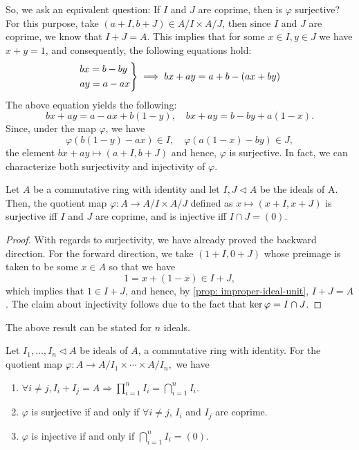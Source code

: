 So, we ask an equivalent question: If $I$ and $J$ are coprime, then is $\varphi$ surjective? For this purpose, take $(a+I, b+J) \in A / I \times A / J$, then since $I$ and $J$ are coprime, we know that $I+J=A$. This implies that for some $x \in I, y \in J$ we have $x+y=1$, and consequently, the following equations hold:
    $$
    \begin{rcases}
    b x=b-b y\\
    ay = a-ax
    \end{rcases} \implies
    b x+a y=a+b-(a x+b y)
    $$
The above equation yields the following:
    $$
    b x+a y = a-a x+b(1-y),\quad b x+a y = b-b y+a(1-x).
    $$
Since, under the map $\varphi$, we have
    $$
    \varphi(b(1-y)-a x) \in I, \quad
    \varphi(a(1-x)-b y)\in J,
    $$
the element $b x+a y \mapsto(a+I, b+J)$ and hence, $\varphi$ is surjective. In fact, we can characterize both surjectivity and injectivity of $\varphi$.
\begin{proposition}\label{prop: quotient-sur-inj-two}
    Let $A$ be a commutative ring with identity and let $I,J \lhd A$ be the ideals of A. Then, the quotient map $\varphi: A \to A/I \times A/J$ defined as $x \mapsto(x+I, x+J)$ is surjective iff $I$ and $J$ are coprime, and is injective iff $I \cap J=(0)$.
\end{proposition}
\begin{proof}
    With regards to surjectivity, we have already proved the backward direction. For the forward direction, we take $(1+I, 0+J)$ whose preimage is taken to be some $x \in A$ so that we have
    \[1 = x + (1-x) \in I+J,\]
    which implies that $1 \in I+J$, and hence, by \cref{prop: improper-ideal-unit}, $I+J = A$.
    The claim about injectivity follows due to the fact that $\operatorname{\text{ker\/}}\varphi = I \cap J$. 
\end{proof}

The above result can be stated for $n$ ideals. 
\begin{proposition}\label{prop: quotient-sur-inj-gen}
Let $I_{1}, \ldots, I_{n} \lhd A$ be ideals of $A$, a commutative ring with identity. For the quotient map
$
\varphi: A \rightarrow A / I_{1} \times \cdots \times A / I_{n}, 
$
we have
\begin{enumerate}
    \item $\forall i \neq j, I_{i}+I_{j}=A \Rightarrow \prod_{i=1}^{n} I_{i}=\bigcap_{i=1}^{n} I_{i}$.
    \item $\varphi$ is surjective if and only if $\forall i \neq j$, $I_{i}$ and $I_{j}$ are coprime.
    \item $\varphi$ is injective if and only if $\bigcap_{i=1}^{n} I_{i}=(0)$.
\end{enumerate}
\end{proposition}

